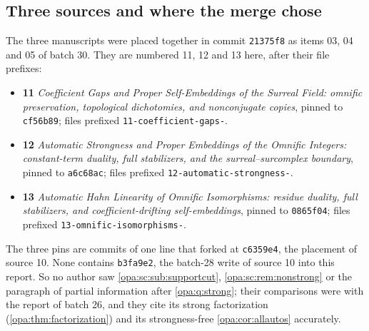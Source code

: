 \documentclass[11pt,oneside]{article}
\numberwithin{equation}{section}
\theoremstyle{definition}
\theoremstyle{remark}
\newcommand{\fn}[1]{\nolinkurl{#1}}
\begin{document}
\subsection{Three sources and where the merge chose}\label{opa:as:sub:sources}

The three manuscripts were placed together in commit \texttt{21375f8} as items 03,
04 and 05 of batch 30. They are numbered 11, 12 and 13 here, after their file
prefixes:
\begin{itemize}[itemsep=2pt]
\item \textbf{11} \emph{Coefficient Gaps and Proper Self-Embeddings of the Surreal
Field: omnific preservation, topological dichotomies, and nonconjugate copies}, pinned
to \texttt{cf56b89}; files prefixed \fn{11-coefficient-gaps-}.
\item \textbf{12} \emph{Automatic Strongness and Proper Embeddings of the Omnific
Integers: constant-term duality, full stabilizers, and the surreal--surcomplex
boundary}, pinned to \texttt{a6c68ac}; files prefixed \fn{12-automatic-strongness-}.
\item \textbf{13} \emph{Automatic Hahn Linearity of Omnific Isomorphisms: residue
duality, full stabilizers, and coefficient-drifting self-embeddings}, pinned to
\texttt{0865f04}; files prefixed \fn{13-omnific-isomorphisms-}.
\end{itemize}
The three pins are commits of one line that forked at \texttt{c6359e4}, the
placement of source 10. None contains \texttt{b3fa9e2}, the batch-28 write of source
10 into this report. So no author saw \cref{opa:sc:sub:supportcut},
\cref{opa:sc:rem:nonstrong} or the paragraph of partial information after
\cref{opa:q:strong}; their comparisons were with the report of batch 26, and they
cite its strong factorization (\cref{opa:thm:factorization}) and its
strongness-free \cref{opa:cor:allautos} accurately.
\end{document}
